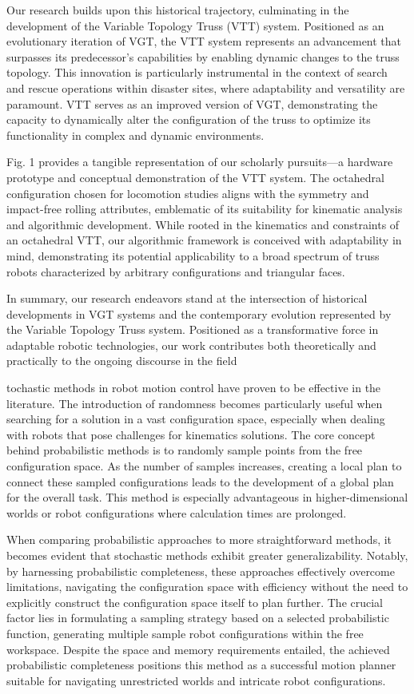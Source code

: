 \documentclass{IEEEtaes}
\begin{document}
Our research builds upon this historical trajectory, culminating in the development of the Variable Topology Truss (VTT) system. Positioned as an evolutionary iteration of VGT, the VTT system represents an advancement that surpasses its predecessor's capabilities by enabling dynamic changes to the truss topology. This innovation is particularly instrumental in the context of search and rescue operations within disaster sites, where adaptability and versatility are paramount. VTT serves as an improved version of VGT, demonstrating the capacity to dynamically alter the configuration of the truss to optimize its functionality in complex and dynamic environments.

Fig. 1 provides a tangible representation of our scholarly pursuits—a hardware prototype and conceptual demonstration of the VTT system. The octahedral configuration chosen for locomotion studies aligns with the symmetry and impact-free rolling attributes, emblematic of its suitability for kinematic analysis and algorithmic development. While rooted in the kinematics and constraints of an octahedral VTT, our algorithmic framework is conceived with adaptability in mind, demonstrating its potential applicability to a broad spectrum of truss robots characterized by arbitrary configurations and triangular faces.

In summary, our research endeavors stand at the intersection of historical developments in VGT systems and the contemporary evolution represented by the Variable Topology Truss system. Positioned as a transformative force in adaptable robotic technologies, our work contributes both theoretically and practically to the ongoing discourse in the field




tochastic methods in robot motion control have proven to be effective in the literature. The introduction of randomness becomes particularly useful when searching for a solution in a vast configuration space, especially when dealing with robots that pose challenges for kinematics solutions. The core concept behind probabilistic methods is to randomly sample points from the free configuration space. As the number of samples increases, creating a local plan to connect these sampled configurations leads to the development of a global plan for the overall task. This method is especially advantageous in higher-dimensional worlds or robot configurations where calculation times are prolonged.

When comparing probabilistic approaches to more straightforward methods, it becomes evident that stochastic methods exhibit greater generalizability. Notably, by harnessing probabilistic completeness, these approaches effectively overcome limitations, navigating the configuration space with efficiency without the need to explicitly construct the configuration space itself to plan further. The crucial factor lies in formulating a sampling strategy based on a selected probabilistic function, generating multiple sample robot configurations within the free workspace. Despite the space and memory requirements entailed, the achieved probabilistic completeness positions this method as a successful motion planner suitable for navigating unrestricted worlds and intricate robot configurations. 
\end{document}

